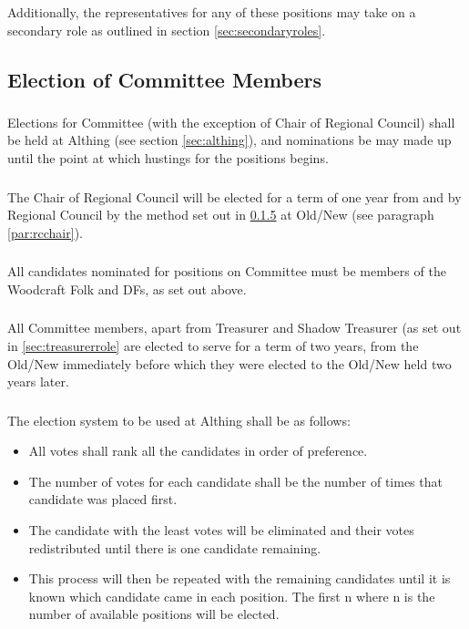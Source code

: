 \documentclass[a4paper, 12pt]{report}
\begin{document}
Additionally, the representatives for any of these positions may take on a secondary role as outlined in section \ref{sec:secondaryroles}.

\subsection{Election of Committee Members}
\label{sec:election}
\subsubsection{}
Elections for Committee (with the exception of Chair of Regional Council) shall be held at Althing (see section \ref{sec:althing}), and nominations be may made up until the point at which hustings for the positions begins.

\subsubsection{}
The Chair of Regional Council will be elected for a term of one year from and by Regional Council by the method set out in \ref{sec:electionprocedure} at Old/New (see paragraph \ref{par:rcchair}).

\subsubsection{}
All candidates nominated for positions on Committee must be members of the Woodcraft Folk and DFs, as set out above.

\subsubsection{}
All Committee members, apart from Treasurer and Shadow Treasurer (as set out in \ref{sec:treasurerrole} are elected to serve for a term of two years, from the Old/New immediately before which they were elected to the Old/New held two years later.

\subsubsection{}
\label{sec:electionprocedure}
The election system to be used at Althing shall be as follows:
\begin{itemize}
\item All votes shall rank all the candidates in order of preference.
\item The number of votes for each candidate shall be the number of times that candidate was placed first.
\item The candidate with the least votes will be eliminated and their votes redistributed until there is one candidate remaining.
\item This process will then be repeated with the remaining candidates until it is known which candidate came in each position. The first n where n is the number of available positions will be elected.
\end{itemize}
\end{document}
